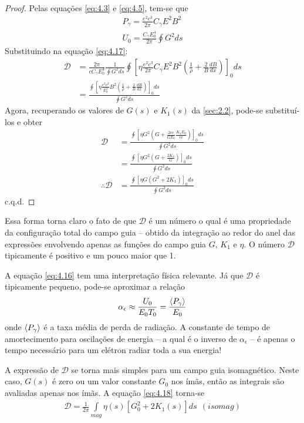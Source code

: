 \begin{proof}
	Pelas equações \eqref{eq:4.3} e \eqref{eq:4.5}, tem-se que
	\begin{align*}
		P_\gamma = \frac{e^2c^3}{2\pi}C_\gamma E^2B^2\\
		U_0 = \frac{C_\gamma E_0^4}{2\pi}\oint G^2 ds
	\end{align*}
	Substituindo na equação \eqref{eq:4.17}:
	\begin{align*}
		\mathscr{D} &= \frac{2\pi}{c C_\gamma E_0^4}\frac{1}{\oint G^2 ds}\oint \left[\eta \frac{e^2c^3}{2\pi}C_\gamma E^2B^2 \left(\frac{1}{\rho}+\frac{2}{B}\frac{dB}{dx}\right)\right]_0 ds\\
					&= \frac{\oint \left[\eta \frac{e^2c^2}{E_0^2} B^2 \left(\frac{1}{\rho}+\frac{2}{B}\frac{dB}{dx}\right)\right]_0 ds}{\oint G^2 ds}
	\end{align*}
	Agora, recuperando os valores de $G(s)$ e $K_1(s)$ da \autoref{sec:2.2}, pode-se substituí-los e obter
	\begin{align*}
		\mathscr{D} &= \frac{\oint \left[\eta G^2 \left(G +\frac{2ec}{G E_0}\frac{K_1 E_0}{ec}\right)\right]_0 ds}{\oint G^2 ds}\\
					&= \frac{\oint \left[\eta G^2 \left(G +\frac{2K_1}{G}\right)\right]_0 ds}{\oint G^2 ds}\\
		\therefore \mathscr{D} &= \frac{\oint \left[\eta G \left(G^2 +2K_1\right)\right]_0 ds}{\oint G^2 ds}
	\end{align*}
	c.q.d.
\end{proof}

Essa forma torna claro o fato de que $\mathscr{D}$ é um número o qual é uma propriedade da configuração total do campo guia -- obtido da integração ao redor do anel das expressões envolvendo apenas as funções do campo guia $G$, $K_1$ e $\eta$. O número $\mathscr{D}$ tipicamente é positivo e um pouco maior que 1.

A equação \eqref{eq:4.16} tem uma interpretação física relevante. Já que $\mathscr{D}$ é tipicamente pequeno, pode-se aproximar a relação
\begin{align}
	\alpha_\epsilon \approx \frac{U_0}{E_0T_0} = \frac{\left< P_\gamma \right>}{E_0}
\end{align}
onde $\left< P_\gamma \right>$ é a taxa média de perda de radiação. A constante de tempo de amortecimento para oscilações de energia -- a qual é o inverso de $\alpha_\epsilon$ -- é apenas o tempo necessário para um elétron radiar toda a sua energia!

A expressão de $\mathscr{D}$ se torna mais simples para um campo guia isomagnético. Neste caso, $G(s)$ é zero ou um valor constante $G_0$ nos ímãs, então as integrais são avaliadas apenas nos ímãs. A equação \eqref{eq:4.18} torna-se
\begin{align}
	\mathscr{D} = \frac{1}{2\pi} \int\limits_{mag}^{}\eta(s)\left[G_0^2 + 2K_1(s)\right]ds\ \ (isomag)
\end{align}

